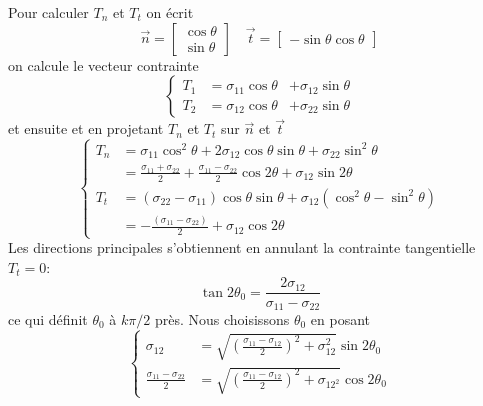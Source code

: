 Pour calculer $T_n$ et $T_t$ on écrit
\begin{displaymath}
    \vec{n} = 
    \begin{bmatrix}
        \cos \theta\\
        \sin \theta
    \end{bmatrix}
    \quad
    \vec{t} = 
    \begin{bmatrix}
        -\sin \theta
        \cos \theta
    \end{bmatrix}
\end{displaymath}
on calcule le vecteur contrainte
\begin{equation}
    \left\{
    \begin{array}{lll}
        T_1 & = \sigma_{11} \cos \theta & + \sigma_{12} \sin \theta\\
        T_2 & = \sigma_{12} \cos \theta & + \sigma_{22} \sin \theta
    \end{array}
    \right.
    \label{eq:Ch02-040}
\end{equation}
et ensuite et en projetant $T_n$ et $T_t$ sur $\vec{n}$ et $\vec{t}$
\begin{equation}
    \left\{
    \begin{aligned}
        T_n &= \sigma_{11} \cos^2 \theta + 2 \sigma_{12} \cos \theta \sin \theta + \sigma_{22} \sin^2 \theta\\
            &= \frac{\sigma_{11} + \sigma_{22}}{2} + \frac{\sigma_{11} - \sigma_{22}}{2} \cos 2 \theta + \sigma_{12} \sin 2 \theta\\
        T_t &= \left(\sigma_{22}-\sigma_{11}\right) \cos \theta \sin \theta + \sigma_{12} \left( \cos^2\theta -\sin^2 \theta \right)\\
            &= -\frac{\left(\sigma_{11}-\sigma_{22}\right)}{2} + \sigma_{12} \cos 2 \theta
    \end{aligned}
    \right.
    \label{eq:Ch02-041}
\end{equation}
Les directions principales s'obtiennent en annulant la contrainte tangentielle $T_t = 0$:
\begin{equation}
    \tan 2 \theta_0 = \frac{2\sigma_{12}}{\sigma_{11} - \sigma_{22}}
    \label{eq:Ch02-042}
\end{equation}
ce qui définit $\theta_0$ à $k\pi/2$ près.
Nous choisissons $\theta_0$ en posant 
\begin{equation}
    \left\{
    \begin{aligned}
        \sigma_{12} &= \sqrt{\left( \frac{\sigma_{11} - \sigma_{12}}{2} \right)^2 + \sigma_{12}^2} \sin 2 \theta_0 \\
        \frac{\sigma_{11} - \sigma_{22}}{2} &= \sqrt{\left( \frac{\sigma_{11} - \sigma_{12}}{2} \right)^2 + \sigma_{12^2}} \cos 2 \theta_0
    \end{aligned}
    \right.
    \label{eq:Ch02-043}
\end{equation}
